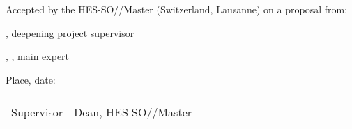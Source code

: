 Accepted by the HES-SO//Master (Switzerland, Lausanne) on a proposal from:

\vspace{0.5cm}

\Supervisor, deepening project supervisor

\Expert, \ExpertLab, main expert

\vspace{1cm}

Place, date: \underline{\hspace{8cm}}

\vspace{3cm}

{ \renewcommand{\arraystretch}{1.5}
\begin{tabularx}{\textwidth}{X X}
	\Supervisor  & \MRU\\
	Supervisor   & Dean, HES-SO//Master\\
\end{tabularx}
}